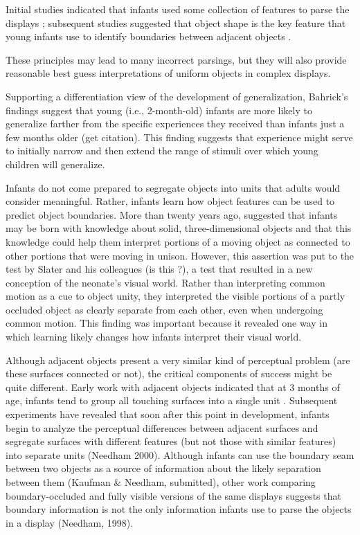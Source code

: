 Initial studies indicated that infants used some collection of
features to parse the displays \cite{needham98infants,needham97object,needham98effects}; subsequent studies suggested that object shape is the key
feature that young infants use to identify boundaries between adjacent
objects \cite{needham99role}.

These principles may lead to many incorrect parsings, but they will
also provide reasonable best guess interpretations of uniform objects
in complex displays.  


Supporting a differentiation view of the development of
generalization, Bahrick's findings suggest that young (i.e.,
2-month-old) infants are more likely to generalize farther from the
specific experiences they received than infants just a few months
older (get citation).  This finding suggests that experience might
serve to initially narrow and then extend the range of stimuli over
which young children will generalize.


Infants do not come prepared to segregate objects into units that
adults would consider meaningful.  Rather, infants learn how object
features can be used to predict object boundaries.  More than twenty
years ago,  suggested that infants may be born
with knowledge about solid, three-dimensional objects and that this
knowledge could help them interpret portions of a moving object as
connected to other portions that were moving in unison.  However, this
assertion was put to the test by Slater and his colleagues (is this
?), a test that resulted in a new conception of
the neonate's visual world.  Rather than interpreting common motion as
a cue to object unity, they interpreted the visible portions of a
partly occluded object as clearly separate from each other, even when
undergoing common motion.  This finding was important because it
revealed one way in which learning likely changes how infants
interpret their visual world.


Although adjacent objects present a very similar kind of perceptual
problem (are these surfaces connected or not), the critical components
of success might be quite different.  Early work with adjacent objects
indicated that at 3 months of age, infants tend to group all touching
surfaces into a single unit \cite{kestenbaum87perception}.
Subsequent experiments have revealed that soon after this point in
development, infants begin to analyze the perceptual differences
between adjacent surfaces and segregate surfaces with different
features (but not those with similar features) into separate units
(Needham 2000).  Although infants can use the boundary seam between
two objects as a source of information about the likely separation
between them (Kaufman \& Needham, submitted), other work comparing
boundary-occluded and fully visible versions of the same displays
suggests that boundary information is not the only information infants
use to parse the objects in a display (Needham, 1998).  

